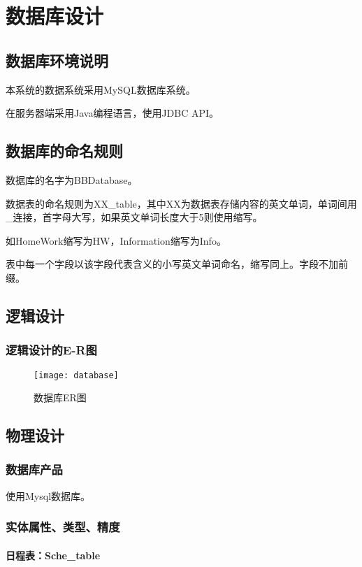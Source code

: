 \chapter{数据库设计}
\section{数据库环境说明}
本系统的数据系统采用MySQL数据库系统。

在服务器端采用Java编程语言，使用JDBC API。

\section{数据库的命名规则}
数据库的名字为BBDatabase。

数据表的命名规则为XX\_table，其中XX为数据表存储内容的英文单词，单词间用\_连接，首字母大写，如果英文单词长度大于5则使用缩写。

如HomeWork缩写为HW，Information缩写为Info。

表中每一个字段以该字段代表含义的小写英文单词命名，缩写同上。字段不加前缀。

\section{逻辑设计}
\subsection{逻辑设计的E-R图}
\begin{figure}[H]
\centering
\texttt{[image: database]}
\caption{数据库ER图}
\end{figure}

\section{物理设计}
\subsection{数据库产品}
使用Mysql数据库。

\subsection{实体属性、类型、精度}
\subsubsection{日程表：Sche\_table}

